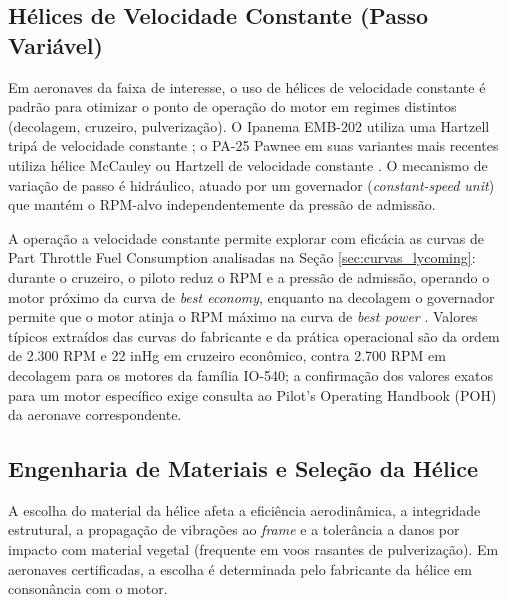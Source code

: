 \documentclass[a4paper,12pt]{article}
\begin{document}
\subsection{Hélices de Velocidade Constante (Passo Variável)}
Em aeronaves da faixa de interesse, o uso de hélices de velocidade constante é padrão para otimizar o ponto de operação do motor em regimes distintos (decolagem, cruzeiro, pulverização). O Ipanema EMB-202 utiliza uma Hartzell tripá de velocidade constante \cite{embraer202, embraer202_wiki}; o PA-25 Pawnee em suas variantes mais recentes utiliza hélice McCauley ou Hartzell de velocidade constante \cite{piper_pa25}. O mecanismo de variação de passo é hidráulico, atuado por um governador (\textit{constant-speed unit}) que mantém o RPM-alvo independentemente da pressão de admissão.

A operação a velocidade constante permite explorar com eficácia as curvas de Part Throttle Fuel Consumption analisadas na Seção \ref{sec:curvas_lycoming}: durante o cruzeiro, o piloto reduz o RPM e a pressão de admissão, operando o motor próximo da curva de \textit{best economy}, enquanto na decolagem o governador permite que o motor atinja o RPM máximo na curva de \textit{best power} \cite{lycomingmanual, io360manual}. Valores típicos extraídos das curvas do fabricante \cite{lycomingmanual, io360manual} e da prática operacional são da ordem de 2.300 RPM e 22 inHg em cruzeiro econômico, contra 2.700 RPM em decolagem para os motores da família IO-540; a confirmação dos valores exatos para um motor específico exige consulta ao Pilot's Operating Handbook (POH) da aeronave correspondente.

\subsection{Engenharia de Materiais e Seleção da Hélice}
A escolha do material da hélice afeta a eficiência aerodinâmica, a integridade estrutural, a propagação de vibrações ao \textit{frame} e a tolerância a danos por impacto com material vegetal (frequente em voos rasantes de pulverização). Em aeronaves certificadas, a escolha é determinada pelo fabricante da hélice em consonância com o motor.
\end{document}
